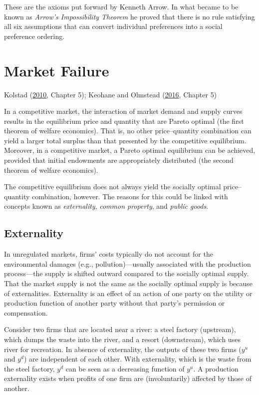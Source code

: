 \documentclass[
]{book}
\begin{document}
These are the axioms put forward by Kenneth Arrow. In what became to be known as \emph{Arrow's Impossibility Theorem} he proved that there is no rule satisfying all six assumptions that can convert individual preferences into a social preference ordering.

\hypertarget{market-failure}{%
\chapter{Market Failure}\label{market-failure}}

Kolstad (\protect\hyperlink{ref-kolstad2010}{2010}, Chapter 5); Keohane and Olmstead (\protect\hyperlink{ref-keohane2016}{2016}, Chapter 5)

In a competitive market, the interaction of market demand and supply curves results in the equilibrium price and quantity that are Pareto optimal (the first theorem of welfare economics). That is, no other price--quantity combination can yield a larger total surplus than that presented by the competitive equilibrium. Moreover, in a competitive market, a Pareto optimal equilibrium can be achieved, provided that initial endowments are appropriately distributed (the second theorem of welfare economics).

The competitive equilibrium does not always yield the socially optimal price--quantity combination, however. The reasons for this could be linked with concepts known as \emph{externality}, \emph{common property}, and \emph{public goods}.

\hypertarget{externality}{%
\section{Externality}\label{externality}}

In unregulated markets, firms' costs typically do not account for the environmental damages (e.g., pollution)---usually associated with the production process---the supply is shifted outward compared to the socially optimal supply. That the market supply is not the same as the socially optimal supply is because of externalities. Externality is an effect of an action of one party on the utility or production function of another party without that party's permission or compensation.

Consider two firms that are located near a river: a steel factory (upstream), which dumps the waste into the river, and a resort (downstream), which uses river for recreation. In absence of externality, the outputs of these two firms (\(y^u\) and \(y^d\)) are independent of each other. With externality, which is the waste from the steel factory, \(y^d\) can be seen as a decreasing function of \(y^u\). A production externality exists when profits of one firm are (involuntarily) affected by those of another.
\end{document}

